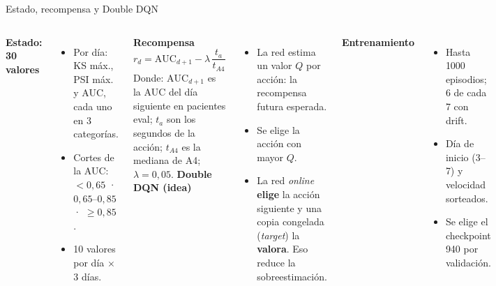\documentclass[aspectratio=169,10pt,xcolor=table]{beamer}
\begin{document}
\begin{frame}{Estado, recompensa y Double DQN}
\begin{columns}[T]
\textbf{Estado: 30 valores}
\begin{itemize}
  \item Por día: KS máx., PSI máx. y AUC, cada uno en 3 categorías.
  \item Cortes de la AUC: $<0{,}65$ · $0{,}65$--$0{,}85$ · $\geq 0{,}85$.
  \item 10 valores por día $\times$ 3 días.
\end{itemize}
\textbf{Recompensa}
\[
r_d = \text{AUC}_{d+1} - \lambda\,\frac{t_a}{t_{A4}}
\]
\footnotesize Donde: $\text{AUC}_{d+1}$ es la AUC del día siguiente en
pacientes eval; $t_a$ son los segundos de la acción; $t_{A4}$ es la mediana de
A4; $\lambda=0{,}05$.
\textbf{Double DQN (idea)}
\begin{itemize}
  \item La red estima un valor $Q$ por acción: la recompensa futura esperada.
  \item Se elige la acción con mayor $Q$.
  \item La red \emph{online} \textbf{elige} la acción siguiente y una copia
        congelada (\emph{target}) la \textbf{valora}. Eso reduce la sobreestimación.
\end{itemize}
\textbf{Entrenamiento}
\begin{itemize}
  \item Hasta 1000 episodios; 6 de cada 7 con drift.
  \item Día de inicio (3--7) y velocidad sorteados.
  \item Se elige el checkpoint 940 por validación.
\end{itemize}
\end{columns}
\end{frame}

\end{document}

